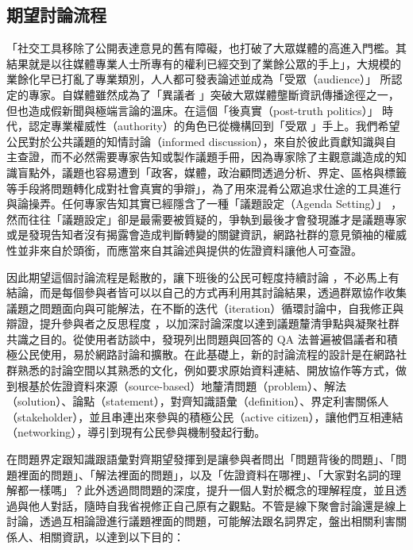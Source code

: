 \documentclass[12pt,a4paper]{article}
\begin{document}
\subsection{期望討論流程}
\label{sec:orge6c14c8}
「社交工具移除了公開表達意見的舊有障礙，也打破了大眾媒體的高進入門檻。其結果就是以往媒體專業人士所專有的權利已經交到了業餘公眾的手上」\citep*[p.59]{xue11_xiang}，大規模的業餘化早已打亂了專業類別，人人都可發表論述並成為「受眾（audience）」\citep*{wimmer03_da} 所認定的專家。自媒體雖然成為了「異議者 」突破大眾媒體壟斷資訊傳播途徑之一，但也造成假新聞與極端言論的溫床。在這個「後真實（post-truth politics）」\citep*{wiki:posttruth} 時代，認定專業權威性（authority）的角色已從機構回到「受眾 」手上。我們希望公民對於公共議題的知情討論（informed discussion），來自於彼此貢獻知識與自主查證，而不必然需要專家告知或製作議題手冊，因為專家除了主觀意識造成的知識盲點外，議題也容易遭到「政客，媒體，政治顧問透過分析、界定、區格與標籤等手段將問題轉化成對社會真實的爭辯」\citep*[p.123]{yanyuan09_gong}，為了用來混肴公眾追求仕途的工具進行與論操弄。任何專家告知其實已經隱含了一種「議題設定（Agenda Setting）」\citep*{wimmer03_da} ，然而往往「議題設定」卻是最需要被質疑的，爭執到最後才會發現誰才是議題專家或是發現告知者沒有揭露會造成判斷轉變的關鍵資訊，網路社群的意見領袖的權威性並非來自於頭銜，而應當來自其論述與提供的佐證資料讓他人可查證。

因此期望這個討論流程是鬆散的，讓下班後的公民可輕度持續討論 \citep*{xueji11_xia} ，不必馬上有結論，而是每個參與者皆可以以自己的方式再利用其討論結果，透過群眾協作收集議題之問題面向與可能解法，在不斷的迭代（iteration）循環討論中，自我修正與辯證，提升參與者之反思程度 \cite{fleck10} ，以加深討論深度以達到議題釐清爭點與凝聚社群共識之目的。從使用者訪談中，發現列出問題與回答的 QA 法普遍被倡議者和積極公民使用，易於網路討論和擴散。在此基礎上，新的討論流程的設計是在網路社群熟悉的討論空間以其熟悉的文化，例如要求原始資料連結、開放協作等方式，做到根基於佐證資料來源（source-based）地釐清問題（problem）、解法（solution）、論點（statement），對齊知識語彙（definition）、界定利害關係人（stakeholder），並且串連出來參與的積極公民（active citizen），讓他們互相連結（networking），導引到現有公民參與機制發起行動。

在問題界定跟知識跟語彙對齊期望發揮到是讓參與者問出「問題背後的問題」、「問題裡面的問題」、「解法裡面的問題」，以及「佐證資料在哪裡」、「大家對名詞的理解都一樣嗎」？此外透過問問題的深度，提升一個人對於概念的理解程度，並且透過與他人對話，隨時自我省視修正自己原有之觀點。不管是線下聚會討論還是線上討論，透過互相論證進行議題裡面的問題，可能解法跟名詞界定，盤出相關利害關係人、相關資訊，以達到以下目的：
\end{document}
